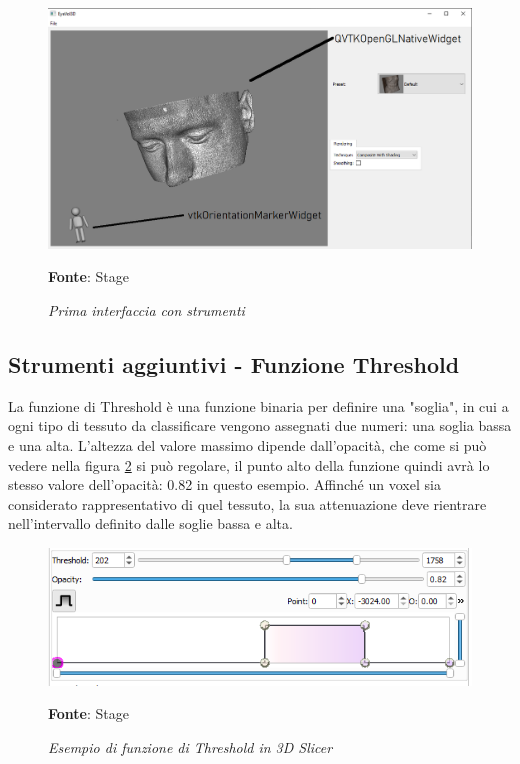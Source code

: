 \begin{figure}[h]
    \centering
    \includegraphics[width=1\textwidth]{immagini/svolgimento/basicwidget.png}
    \caption{\textit{Prima interfaccia con strumenti}}
    \textbf{Fonte}: Stage
    \label{fig: basicwidget}
\end{figure}

\subsection{Strumenti aggiuntivi - Funzione Threshold}
La funzione di Threshold è una funzione binaria per definire una "soglia", in cui a ogni tipo di tessuto da classificare vengono assegnati due numeri: una soglia bassa e una alta. L'altezza del valore massimo dipende dall'opacità, che come si può vedere nella figura \ref{fig: Threshold} si può regolare, il punto alto della funzione quindi avrà lo stesso valore dell'opacità: 0.82 in questo esempio. Affinché un voxel sia considerato rappresentativo di quel tessuto, la sua attenuazione deve rientrare nell'intervallo definito dalle soglie bassa e alta.

\begin{figure}[h]
    \centering
    \includegraphics[width=1\textwidth]{immagini/svolgimento/slicerthreshold.png}
    \caption{\textit{Esempio di funzione di Threshold in 3D Slicer}}
    \textbf{Fonte}: Stage
    \label{fig: Threshold}
\end{figure}

